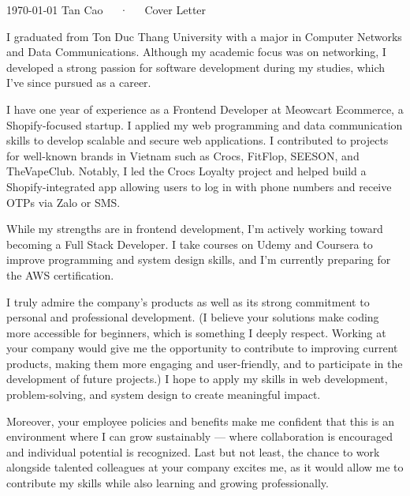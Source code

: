 \documentclass[11pt, a4paper]{awesome-cv}
\begin{document}
\makecvheader[R]

\makecvfooter
  {\today}
  {Tan Cao~~~·~~~Cover Letter}
  {}

\makelettertitle

\begin{cvletter}

I graduated from Ton Duc Thang University with a major in Computer Networks and Data Communications. Although my academic focus was on networking, I developed a strong passion for software development during my studies, which I’ve since pursued as a career.

I have one year of experience as a Frontend Developer at Meowcart Ecommerce, a Shopify-focused startup. I applied my web programming and data communication skills to develop scalable and secure web applications. I contributed to projects for well-known brands in Vietnam such as Crocs, FitFlop, SEESON, and TheVapeClub. Notably, I led the Crocs Loyalty project and helped build a Shopify-integrated app allowing users to log in with phone numbers and receive OTPs via Zalo or SMS.

While my strengths are in frontend development, I’m actively working toward becoming a Full Stack Developer. I take courses on Udemy and Coursera to improve programming and system design skills, and I’m currently preparing for the AWS certification.

I truly admire the company’s products as well as its strong commitment to personal and professional development. (I believe your solutions make coding more accessible for beginners, which is something I deeply respect. Working at your company would give me the opportunity to contribute to improving current products, making them more engaging and user-friendly, and to participate in the development of future projects.) I hope to apply my skills in web development, problem-solving, and system design to create meaningful impact.

Moreover, your employee policies and benefits make me confident that this is an environment where I can grow sustainably — where collaboration is encouraged and individual potential is recognized. Last but not least, the chance to work alongside talented colleagues at your company excites me, as it would allow me to contribute my skills while also learning and growing professionally.


\end{cvletter}
\end{document}
